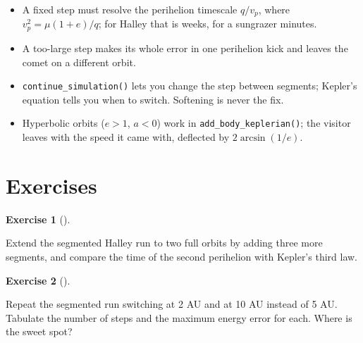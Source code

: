 \documentclass[
  10.5pt,
  letterpaper,
]{scrbook}
\providecommand{\tightlist}{%
  \setlength{\itemsep}{0pt}\setlength{\parskip}{0pt}}
\theoremstyle{definition}
\newtheorem{exercise}{Exercise}[chapter]
\theoremstyle{plain}
\theoremstyle{remark}
\begin{document}
\begin{tcolorbox}[enhanced jigsaw, arc=.35mm, bottomrule=.15mm, bottomtitle=1mm, breakable, colback=white, colbacktitle=quarto-callout-tip-color!10!white, colframe=quarto-callout-tip-color-frame, coltitle=black, left=2mm, leftrule=.75mm, opacityback=0, opacitybacktitle=0.6, rightrule=.15mm, title={Key results}, titlerule=0mm, toprule=.15mm, toptitle=1mm]

\begin{itemize}
\tightlist
\item
  A fixed step must resolve the perihelion timescale \(q/v_p\), where
  \(v_p^2 = \mu(1+e)/q\); for Halley that is weeks, for a sungrazer
  minutes.
\item
  A too-large step makes its whole error in one perihelion kick and
  leaves the comet on a different orbit.
\item
  \texttt{continue\_simulation()} lets you change the step between
  segments; Kepler's equation tells you when to switch. Softening is
  never the fix.
\item
  Hyperbolic orbits (\(e > 1\), \(a < 0\)) work in
  \texttt{add\_body\_keplerian()}; the visitor leaves with the speed it
  came with, deflected by \(2\arcsin(1/e)\).
\end{itemize}

\end{tcolorbox}

\section*{Exercises}\label{exercises-12}


\begin{exercise}[]\protect\hypertarget{exr-ch13-two-orbits}{}\label{exr-ch13-two-orbits}

Extend the segmented Halley run to two full orbits by adding three more
segments, and compare the time of the second perihelion with Kepler's
third law.

\end{exercise}

\begin{exercise}[]\protect\hypertarget{exr-ch13-switch-radius}{}\label{exr-ch13-switch-radius}

Repeat the segmented run switching at 2 AU and at 10 AU instead of 5 AU.
Tabulate the number of steps and the maximum energy error for each.
Where is the sweet spot?

\end{exercise}
\end{document}
